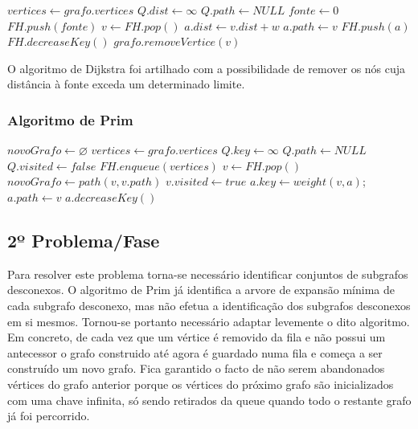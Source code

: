 \documentclass[a4paper,12pt,titlepage]{article}
\begin{document}
\begin{algorithmic}[1]
\State $vertices \gets grafo.vertices$
\State $Q.dist \gets \infty$
\State $Q.path \gets NULL$
\EndFor
\State $fonte \gets 0$
\State $FH.push(fonte)$
\State $v \gets FH.pop()$
	\State $a.dist \gets v.dist + w$
	\State $a.path \gets v$
		\State $FH.push(a)$
	\Else
		\State $FH.decreaseKey()$
	\EndIf
\EndIf
\EndFor
\EndWhile
\EndProcedure
{}
\State $grafo.removeVertice(v)$
\EndIf
\EndFor
\EndProcedure
\end{algorithmic}

O algoritmo de Dijkstra foi artilhado com a possibilidade de remover os nós cuja distância à fonte exceda um determinado limite.

\subsubsection{Algoritmo de Prim}
\begin{algorithmic}[1]
\State $novoGrafo \gets \varnothing$
\State $vertices \gets grafo.vertices$
\State $Q.key \gets \infty$
\State $Q.path \gets NULL$
\State $Q.visited \gets false$
\EndFor
\State $FH.enqueue(vertices)$
\State $v \gets FH.pop()$
\State $novoGrafo \gets path(v, v.path)$
\State $v.visited \gets true$
\State $a.key \gets weight(v,a)$;
\State $a.path \gets v$
\State $a.decreaseKey()$
\EndIf
\EndFor
\EndWhile
\EndProcedure

\end{algorithmic}


\subsection{2º Problema/Fase}
Para resolver este problema torna-se necessário identificar conjuntos de subgrafos desconexos. O algoritmo de Prim já identifica a arvore de expansão mínima de cada subgrafo desconexo, mas não efetua a identificação dos subgrafos desconexos em si mesmos. Tornou-se portanto necessário adaptar levemente o dito algoritmo. Em concreto, de cada vez que um vértice é removido da fila e não possui um antecessor o grafo construido até agora é guardado numa fila e começa a ser construído um novo grafo. Fica garantido o facto de não serem abandonados vértices do grafo anterior porque os vértices do próximo grafo são inicializados com uma chave infinita, só sendo retirados da queue quando todo o restante grafo já foi percorrido.
\end{document}
